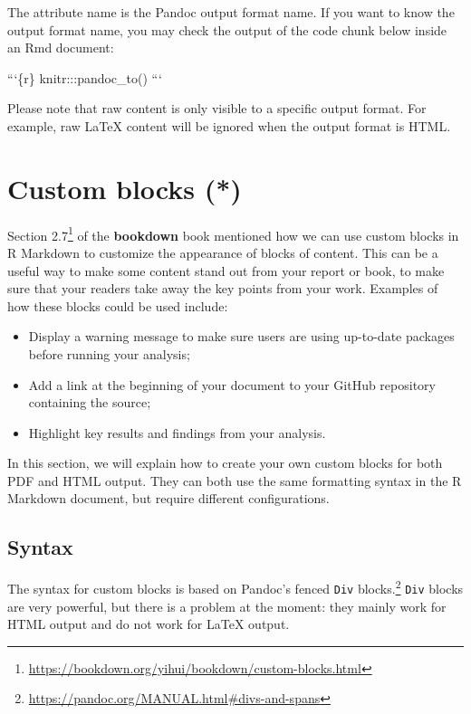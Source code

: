 \documentclass[
  11pt,
]{krantz}
\newenvironment{Shaded}{\begin{snugshade}}{\end{snugshade}}
\newcommand{\BaseNTok}[1]{\textcolor[rgb]{0.06,0.06,0.06}{#1}}
\renewcommand{\href}[2]{#2\footnote{\url{#1}}}
\begin{document}
The attribute name is the Pandoc output format name. If you want to know the output format name, you may check the output of the code chunk below inside an Rmd document:

\begin{Shaded}
\begin{Highlighting}[]
\BaseNTok{```\{r\}}
\BaseNTok{knitr:::pandoc_to()}
\BaseNTok{```}
\end{Highlighting}
\end{Shaded}

Please note that raw content is only visible to a specific output format. For example, raw LaTeX content will be ignored when the output format is HTML.

\hypertarget{custom-blocks}{%
\section{Custom blocks (*)}\label{custom-blocks}}

\href{https://bookdown.org/yihui/bookdown/custom-blocks.html}{Section 2.7} of the \textbf{bookdown} book mentioned how we can use custom blocks in R Markdown to customize the appearance of blocks of content. This can be a useful way to make some content stand out from your report or book, to make sure that your readers take away the key points from your work. Examples of how these blocks could be used include:

\begin{itemize}
\item
  Display a warning message to make sure users are using up-to-date packages before running your analysis;
\item
  Add a link at the beginning of your document to your GitHub repository containing the source;
\item
  Highlight key results and findings from your analysis.
\end{itemize}

In this section, we will explain how to create your own custom blocks for both PDF and HTML output. They can both use the same formatting syntax in the R Markdown document, but require different configurations.

\hypertarget{block-syntax}{%
\subsection{Syntax}\label{block-syntax}}

The syntax for custom blocks is based on Pandoc's \href{https://pandoc.org/MANUAL.html\#divs-and-spans}{fenced \texttt{Div} blocks.} \texttt{Div} blocks are very powerful, but there is a problem at the moment: they mainly work for HTML output and do not work for LaTeX output.
\end{document}
